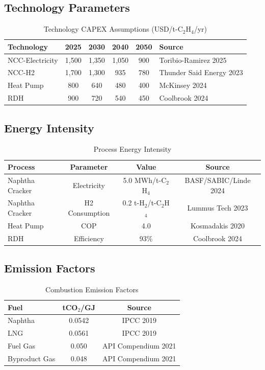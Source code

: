 \documentclass[12pt,a4paper]{article}
\begin{document}
\subsection{Technology Parameters}

\begin{table}[H]
\centering
\caption{Technology CAPEX Assumptions (USD/t-C$_2$H$_4$/yr)}
\begin{tabular}{lccccl}
\toprule
Technology & 2025 & 2030 & 2040 & 2050 & Source \\
\midrule
NCC-Electricity & 1,500 & 1,350 & 1,050 & 900 & Toribio-Ramirez 2025 \\
NCC-H2 & 1,700 & 1,300 & 935 & 780 & Thunder Said Energy 2023 \\
Heat Pump & 800 & 640 & 480 & 400 & McKinsey 2024 \\
RDH & 900 & 720 & 540 & 450 & Coolbrook 2024 \\
\bottomrule
\end{tabular}
\end{table}

\subsection{Energy Intensity}

\begin{table}[H]
\centering
\caption{Process Energy Intensity}
\begin{tabular}{lccc}
\toprule
Process & Parameter & Value & Source \\
\midrule
Naphtha Cracker & Electricity & 5.0 MWh/t-C$_2$H$_4$ & BASF/SABIC/Linde 2024 \\
Naphtha Cracker & H2 Consumption & 0.2 t-H$_2$/t-C$_2$H$_4$ & Lummus Tech 2023 \\
Heat Pump & COP & 4.0 & Kosmadakis 2020 \\
RDH & Efficiency & 93\% & Coolbrook 2024 \\
\bottomrule
\end{tabular}
\end{table}

\subsection{Emission Factors}

\begin{table}[H]
\centering
\caption{Combustion Emission Factors}
\begin{tabular}{lcc}
\toprule
Fuel & tCO$_2$/GJ & Source \\
\midrule
Naphtha & 0.0542 & IPCC 2019 \\
LNG & 0.0561 & IPCC 2019 \\
Fuel Gas & 0.050 & API Compendium 2021 \\
Byproduct Gas & 0.048 & API Compendium 2021 \\
\bottomrule
\end{tabular}
\end{table}
\end{document}
